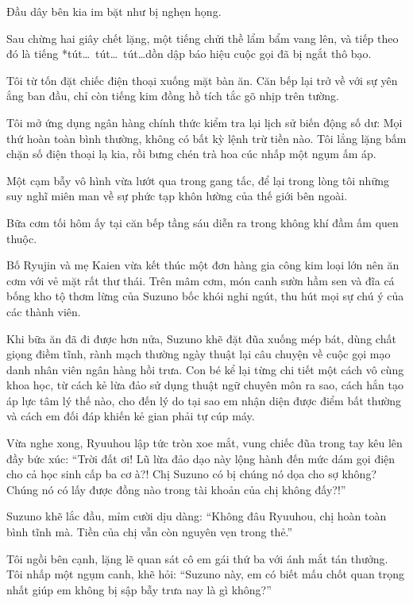 \documentclass[../main.tex]{subfiles}
\begin{document}
Đầu dây bên kia im bặt như bị nghẹn họng.

Sau chừng hai giây chết lặng, một tiếng chửi thề lẩm bẩm vang lên, và tiếp theo đó là tiếng *tút\dots\ tút\dots\ tút\dots* dồn dập báo hiệu cuộc gọi đã bị ngắt thô bạo.

Tôi từ tốn đặt chiếc điện thoại xuống mặt bàn ăn. Căn bếp lại trở về với sự yên ắng ban đầu, chỉ còn tiếng kim đồng hồ tích tắc gõ nhịp trên tường.

Tôi mở ứng dụng ngân hàng chính thức kiểm tra lại lịch sử biến động số dư: Mọi thứ hoàn toàn bình thường, không có bất kỳ lệnh trừ tiền nào. Tôi lẳng lặng bấm chặn số điện thoại lạ kia, rồi bưng chén trà hoa cúc nhấp một ngụm ấm áp.

Một cạm bẫy vô hình vừa lướt qua trong gang tấc, để lại trong lòng tôi những suy nghĩ miên man về sự phức tạp khôn lường của thế giới bên ngoài.

\ct


Bữa cơm tối hôm ấy tại căn bếp tầng sáu diễn ra trong không khí đầm ấm quen thuộc.

Bố Ryujin và mẹ Kaien vừa kết thúc một đơn hàng gia công kim loại lớn nên ăn cơm với vẻ mặt rất thư thái. Trên mâm cơm, món canh sườn hầm sen và đĩa cá bống kho tộ thơm lừng của Suzuno bốc khói nghi ngút, thu hút mọi sự chú ý của các thành viên.

Khi bữa ăn đã đi được hơn nửa, Suzuno khẽ đặt đũa xuống mép bát, dùng chất giọng điềm tĩnh, rành mạch thường ngày thuật lại câu chuyện về cuộc gọi mạo danh nhân viên ngân hàng hồi trưa. Con bé kể lại từng chi tiết một cách vô cùng khoa học, từ cách kẻ lừa đảo sử dụng thuật ngữ chuyên môn ra sao, cách hắn tạo áp lực tâm lý thế nào, cho đến lý do tại sao em nhận diện được điểm bất thường và cách em đối đáp khiến kẻ gian phải tự cúp máy.

Vừa nghe xong, Ryuuhou lập tức tròn xoe mắt, vung chiếc đũa trong tay kêu lên đầy bức xúc: ``Trời đất ơi! Lũ lừa đảo dạo này lộng hành đến mức dám gọi điện cho cả học sinh cấp ba cơ à?! Chị Suzuno có bị chúng nó dọa cho sợ không? Chúng nó có lấy được đồng nào trong tài khoản của chị không đấy?!''

Suzuno khẽ lắc đầu, mỉm cười dịu dàng: ``Không đâu Ryuuhou, chị hoàn toàn bình tĩnh mà. Tiền của chị vẫn còn nguyên vẹn trong thẻ.''

Tôi ngồi bên cạnh, lặng lẽ quan sát cô em gái thứ ba với ánh mắt tán thưởng. Tôi nhấp một ngụm canh, khẽ hỏi: ``Suzuno này, em có biết mấu chốt quan trọng nhất giúp em không bị sập bẫy trưa nay là gì không?''
\end{document}
